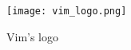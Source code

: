 \begin{frame}[fragile]
  \frametitle{\vimwebsite}
  \begin{figure}\label{fig:vim-logo}
    \centering
    \texttt{[image: vim\_logo.png]}
    \caption{Vim's logo}
  \end{figure}
\end{frame}
